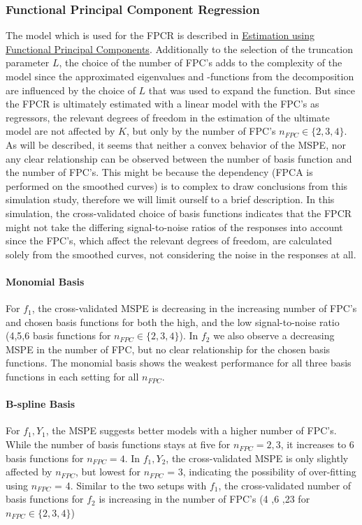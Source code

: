 \documentclass[11pt,twoside,a4paper]{article}
\begin{document}
	\subsubsection{Functional Principal Component Regression}
		The model which is used for the FPCR is described in \hyperref[fpc_exp_transf]{Estimation using Functional Principal Components}. Additionally to the selection of the truncation parameter $L$, the choice of the number of FPC's adds to the complexity of the model since the approximated eigenvalues and -functions from the decomposition are influenced by the choice of $L$ that was used to expand the function. But since the FPCR is ultimately estimated with a linear model with the FPC's as regressors, the relevant degrees of freedom in the estimation of the ultimate model are not affected by $K$, but only by the number of FPC's $n_{FPC} \in \{2, 3, 4 \}$. As will be described, it seems that neither a convex behavior of the MSPE, nor any clear relationship can be observed between the number of basis function and the number of FPC's. This might be because the dependency (FPCA is performed on the smoothed curves) is to complex to draw conclusions from this simulation study, therefore we will limit ourself to a brief description. In this simulation, the cross-validated choice of basis functions indicates that the FPCR might not take the differing signal-to-noise ratios of the responses into account since the FPC's, which affect the relevant degrees of freedom, are calculated solely from the smoothed curves, not considering the noise in the responses at all.
	
	\paragraph{Monomial Basis}
	For $f_1$, the cross-validated MSPE is decreasing in the increasing number of FPC's and chosen basis functions for both the high, and the low signal-to-noise ratio (4,5,6 basis functions for $n_{FPC} \in \{2, 3, 4 \}$). In  $f_2$ we also observe a decreasing MSPE in the number of FPC, but no clear relationship for the chosen basis functions. The monomial basis shows the weakest performance for all three basis functions in each setting for all $n_{FPC}$.
	\vspace{-0.2cm}
	
	\paragraph{B-spline Basis}
	For $f_1,Y_1$, the MSPE suggests better models with a higher number of FPC's. While the number of basis functions stays at five for $n_{FPC} = 2,3$, it increases to 6 basis functions for $n_{FPC} = 4$. In $f_1,Y_2$, the cross-validated MSPE is only slightly affected by $n_{FPC}$, but lowest for $n_{FPC}$ = 3, indicating the possibility of over-fitting using $n_{FPC}$ = 4. Similar to the two setups with $f_1$, the cross-validated number of basis functions for $f_2$ is increasing in the number of FPC's (4 ,6 ,23 for $n_{FPC} \in \{2, 3, 4 \}$)
	\vspace{-0.2cm}
	
\end{document}
